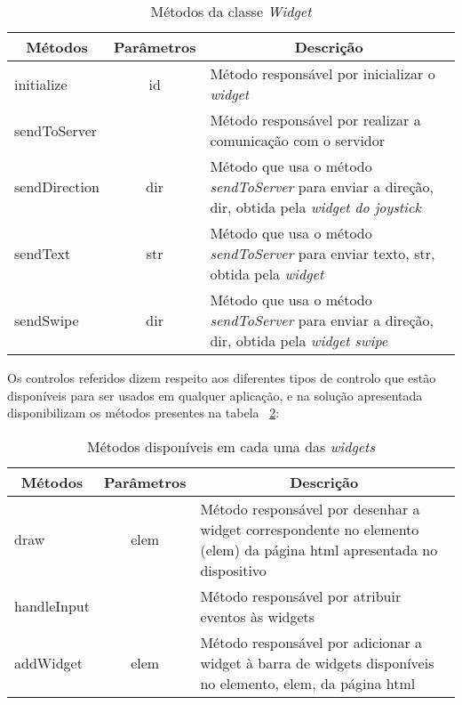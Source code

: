 	\begin{table}[ht]
 	\renewcommand{\arraystretch}{1.5}
	\centering
	\caption{Métodos da classe \textit{Widget}}
	\begin{tabular}{ p{2cm} p{2cm} p{10cm}  }
	\hline
	\multicolumn{1}{c}{\textbf{Métodos}} & \multicolumn{1}{c}{\textbf{Parâmetros}} & \multicolumn{1}{c}{\textbf{Descrição}} \\
	\hline
	initialize & \multicolumn{1}{c}{id} &Método responsável por inicializar o \textit{widget} \\
	\hline
	sendToServer & \multicolumn{1}{c}{} &Método responsável por realizar a comunicação com o servidor \\
	\hline
	sendDirection & \multicolumn{1}{c}{dir} &Método que usa o método \textit{sendToServer} para enviar a direção, dir, obtida pela \textit{widget do joystick} \\
	\hline
	sendText & \multicolumn{1}{c}{str} &Método que usa o método \textit{sendToServer} para enviar texto, str, obtida pela \textit{widget}  \\
	\hline
	sendSwipe & \multicolumn{1}{c}{dir} &Método que usa o método \textit{sendToServer} para enviar a direção, dir, obtida pela \textit{widget swipe}  \\
	\hline
	\end{tabular}
	\label{table:widget_met}
	\end{table}
	
	Os controlos referidos dizem respeito aos diferentes tipos de controlo que estão disponíveis para ser usados em qualquer aplicação, e na solução apresentada disponibilizam os métodos presentes na tabela ~\ref{table:metodos}:
	
 	\begin{table}[ht]
 	\renewcommand{\arraystretch}{1.5}
	\centering
	\caption{Métodos disponíveis em cada uma das \textit{widgets}}
	\begin{tabular}{ p{2cm} p{2cm} p{10cm}  }
	\hline
	\multicolumn{1}{c}{\textbf{Métodos}} & \multicolumn{1}{c}{\textbf{Parâmetros}} & \multicolumn{1}{c}{\textbf{Descrição}} \\
	\hline
	draw & \multicolumn{1}{c}{elem} &Método responsável por desenhar a widget correspondente no elemento (elem) da página html apresentada no dispositivo \\
	\hline
	handleInput & \multicolumn{1}{c}{} &Método responsável por atribuir eventos às widgets \\
	\hline
	addWidget & \multicolumn{1}{c}{elem} &Método responsável por adicionar a widget à barra de widgets disponíveis no elemento, elem, da página html \\
	\hline
	\end{tabular}
	
	\label{table:metodos}
	\end{table}


